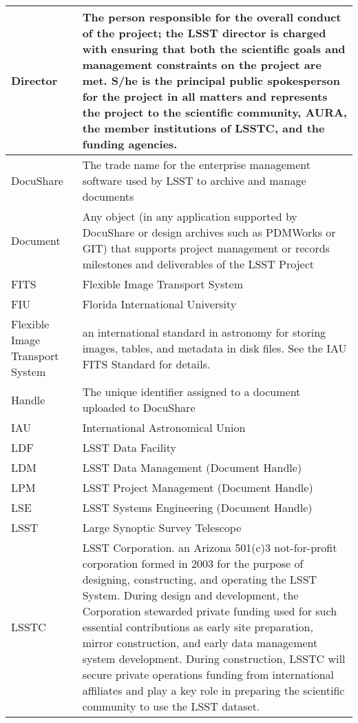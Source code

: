 \begin{longtable}{|l|p{}|}
Director & The person responsible for the overall conduct of the project; the LSST director is charged with ensuring that both the scientific goals and management constraints on the project are met. S/he is the principal public spokesperson for the project in all matters and represents the project to the scientific community, \gls{AURA}, the member institutions of \gls{LSSTC}, and the funding agencies. \\\hline
DocuShare & The trade name for the enterprise management software used by \gls{LSST} to archive and manage documents \\\hline
Document & Any object (in any application supported by \gls{DocuShare} or design archives such as PDMWorks or GIT) that supports project management or records milestones and deliverables of the \gls{LSST} Project \\\hline
FITS & \gls{Flexible Image Transport System} \\\hline
FIU & Florida International University \\\hline
Flexible Image Transport System & an international standard in astronomy for storing images, tables, and \gls{metadata} in disk files. See the \gls{IAU} \gls{FITS} Standard for details. \\\hline
Handle & The unique identifier assigned to a document uploaded to \gls{DocuShare} \\\hline
IAU & International Astronomical Union \\\hline
LDF & \gls{LSST} Data Facility \\\hline
LDM & \gls{LSST} \gls{Data Management} (\gls{Document} \gls{Handle}) \\\hline
LPM & \gls{LSST} Project Management (\gls{Document} \gls{Handle}) \\\hline
LSE & \gls{LSST} \gls{Systems Engineering} (\gls{Document} \gls{Handle}) \\\hline
LSST & Large Synoptic Survey Telescope \\\hline
LSSTC & \gls{LSST} Corporation. an Arizona 501(c)3 not-for-profit corporation formed in 2003 for the purpose of designing, constructing, and operating the LSST System. During design and development, the Corporation stewarded private funding used for such essential contributions as early site preparation, mirror construction, and early data management system development. During construction, \gls{LSSTC} will secure private operations funding from international affiliates and play a key role in preparing the scientific community to use the LSST dataset. \\\hline

\end{longtable}
